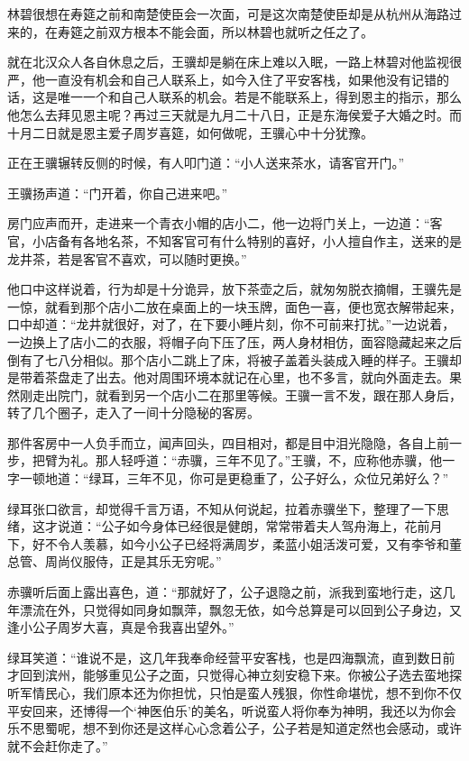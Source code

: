林碧很想在寿筵之前和南楚使臣会一次面，可是这次南楚使臣却是从杭州从海路过来的，在寿筵之前双方根本不能会面，所以林碧也就听之任之了。

就在北汉众人各自休息之后，王骥却是躺在床上难以入眠，一路上林碧对他监视很严，他一直没有机会和自己人联系上，如今入住了平安客栈，如果他没有记错的话，这是唯一一个和自己人联系的机会。若是不能联系上，得到恩主的指示，那么他怎么去拜见恩主呢？再过三天就是九月二十八日，正是东海侯爱子大婚之时。而十月二日就是恩主爱子周岁喜筵，如何做呢，王骥心中十分犹豫。

正在王骥辗转反侧的时候，有人叩门道：“小人送来茶水，请客官开门。”

王骥扬声道：“门开着，你自己进来吧。”

房门应声而开，走进来一个青衣小帽的店小二，他一边将门关上，一边道：“客官，小店备有各地名茶，不知客官可有什么特别的喜好，小人擅自作主，送来的是龙井茶，若是客官不喜欢，可以随时更换。”

他口中这样说着，行为却是十分诡异，放下茶壶之后，就匆匆脱衣摘帽，王骥先是一惊，就看到那个店小二放在桌面上的一块玉牌，面色一喜，便也宽衣解带起来，口中却道：“龙井就很好，对了，在下要小睡片刻，你不可前来打扰。”一边说着，一边换上了店小二的衣服，将帽子向下压了压，两人身材相仿，面容隐藏起来之后倒有了七八分相似。那个店小二跳上了床，将被子盖着头装成入睡的样子。王骥却是带着茶盘走了出去。他对周围环境本就记在心里，也不多言，就向外面走去。果然刚走出院门，就看到另一个店小二在那里等候。王骥一言不发，跟在那人身后，转了几个圈子，走入了一间十分隐秘的客房。

那件客房中一人负手而立，闻声回头，四目相对，都是目中泪光隐隐，各自上前一步，把臂为礼。那人轻呼道：“赤骥，三年不见了。”王骥，不，应称他赤骥，他一字一顿地道：“绿耳，三年不见，你可是更稳重了，公子好么，众位兄弟好么？”

绿耳张口欲言，却觉得千言万语，不知从何说起，拉着赤骥坐下，整理了一下思绪，这才说道：“公子如今身体已经很是健朗，常常带着夫人驾舟海上，花前月下，好不令人羡慕，如今小公子已经将满周岁，柔蓝小姐活泼可爱，又有李爷和董总管、周尚仪服侍，正是其乐无穷呢。”

赤骥听后面上露出喜色，道：“那就好了，公子退隐之前，派我到蛮地行走，这几年漂流在外，只觉得如同身如飘萍，飘忽无依，如今总算是可以回到公子身边，又逢小公子周岁大喜，真是令我喜出望外。”

绿耳笑道：“谁说不是，这几年我奉命经营平安客栈，也是四海飘流，直到数日前才回到滨州，能够重见公子之面，只觉得心神立刻安稳下来。你被公子选去蛮地探听军情民心，我们原本还为你担忧，只怕是蛮人残狠，你性命堪忧，想不到你不仅平安回来，还博得一个‘神医伯乐’的美名，听说蛮人将你奉为神明，我还以为你会乐不思蜀呢，想不到你还是这样心心念着公子，公子若是知道定然也会感动，或许就不会赶你走了。”

